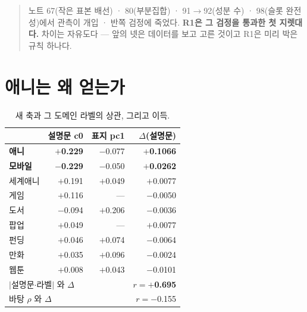 \documentclass[10pt]{article}
\begin{document}
\begin{quote}\fontsize{9.5}{11.5}\selectfont
노트 67(작은 표본 배선) · 80(부분집합) · 91$\to$92(성분 수) · 98(슬롯 완전성)에서
관측이 개입 · 반쪽 검정에 죽었다. \textbf{R1은 그 검정을 통과한 첫 지렛대다.}
차이는 자유도다 --- 앞의 넷은 데이터를 보고 고른 것이고 R1은 미리 박은
규칙 하나다.
\end{quote}

\section{애니는 왜 얻는가}

\begin{table}[t]
\centering\tsize
\caption{새 축과 그 도메인 라벨의 상관, 그리고 이득.}
\begin{tabular}{lrrr}
\toprule
& 설명문 c0 & 표지 pc1 & $\Delta$(설명문) \\
\midrule
\textbf{애니} & \textbf{$+$0.229} & $-$0.077 & \textbf{$+$0.1066} \\
\textbf{모바일} & \textbf{$-$0.229} & $-$0.050 & \textbf{$+$0.0262} \\
세계애니 & $+$0.191 & $+$0.049 & $+$0.0077 \\
게임 & $+$0.116 & --- & $-$0.0050 \\
도서 & $-$0.094 & $+$0.206 & $-$0.0036 \\
팝업 & $+$0.049 & --- & $+$0.0077 \\
펀딩 & $+$0.046 & $+$0.074 & $-$0.0064 \\
만화 & $+$0.035 & $+$0.096 & $-$0.0024 \\
웹툰 & $+$0.008 & $+$0.043 & $-$0.0101 \\
\midrule
\multicolumn{2}{l}{$|$설명문$\cdot$라벨$|$ 와 $\Delta$} & & \textbf{$r{=}+$0.695} \\
\multicolumn{2}{l}{바탕 $\rho$ 와 $\Delta$} & & $r{=}-$0.155 \\
\bottomrule
\end{tabular}
\end{table}

\end{document}
